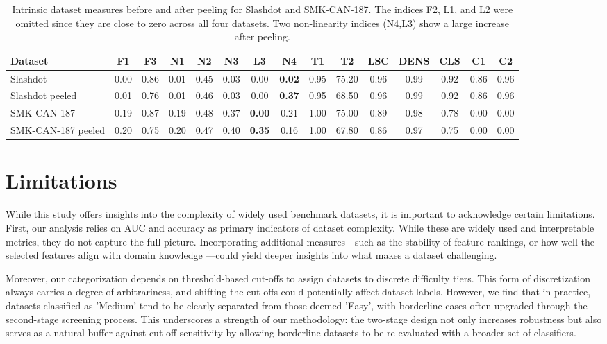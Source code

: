 \documentclass[preprint,12pt,authoryear]{elsarticle}
\begin{document}
\begin{table}[h!]
\centering
\caption{Intrinsic dataset measures before and after peeling for Slashdot and SMK-CAN-187. 
The indices F2, L1, and L2 were omitted since they are close to zero across all four datasets.  Two non-linearity indices (N4,L3) show a large increase after peeling.}
\label{tab:peeling_intrinsic_final}
\scriptsize
\begin{tabular}{lcccccccccccccc}
\toprule
\textbf{Dataset} & \textbf{F1} & \textbf{F3} & \textbf{N1} & \textbf{N2} & \textbf{N3} & \textbf{L3} & \textbf{N4} & \textbf{T1} & \textbf{T2} & \textbf{LSC} & \textbf{DENS} & \textbf{CLS} & \textbf{C1} & \textbf{C2} \\
\midrule
Slashdot & 0.00 & 0.86 & 0.01 & 0.45 & 0.03 & 0.00 & \bf{0.02} & 0.95 & 75.20 & 0.96 & 0.99 & 0.92 & 0.86 & 0.96 \\
Slashdot peeled & 0.01 & 0.76 & 0.01 & 0.46 & 0.03 & 0.00 & \bf{0.37} & 0.95 & 68.50 & 0.96 & 0.99 & 0.92 & 0.86 & 0.96 \\
\midrule
SMK-CAN-187 & 0.19 & 0.87 & 0.19 & 0.48 & 0.37 & \bf{0.00} & 0.21 & 1.00 & 75.00 & 0.89 & 0.98 & 0.78 & 0.00 & 0.00 \\
SMK-CAN-187 peeled & 0.20 & 0.75 & 0.20 & 0.47 & 0.40 & \bf{0.35} & 0.16 & 1.00 & 67.80 & 0.86 & 0.97 & 0.75 & 0.00 & 0.00 \\
\bottomrule
\end{tabular}
\end{table}


\section{Limitations}\label{sec:limit}

While this study offers insights into the complexity of widely used benchmark datasets, it is important to acknowledge certain limitations. First, our analysis relies on AUC and accuracy as primary indicators of dataset complexity. While these are widely used and interpretable metrics, they do not capture the full picture. Incorporating additional measures—such as the stability of feature rankings, or how well the selected features align with domain knowledge —could yield deeper insights into what makes a dataset challenging. 

Moreover, our categorization depends on threshold-based cut-offs to assign datasets to discrete difficulty tiers. This form of discretization always carries a degree of arbitrariness, and shifting the cut-offs could potentially affect dataset labels. However, we find that in practice, datasets classified as 'Medium' tend to be clearly separated from those deemed 'Easy', with borderline cases often upgraded through the second-stage screening process. This underscores a strength of our methodology: the two-stage design not only increases robustness but also serves as a natural buffer against cut-off sensitivity by allowing borderline datasets to be re-evaluated with a broader set of classifiers.
\end{document}
